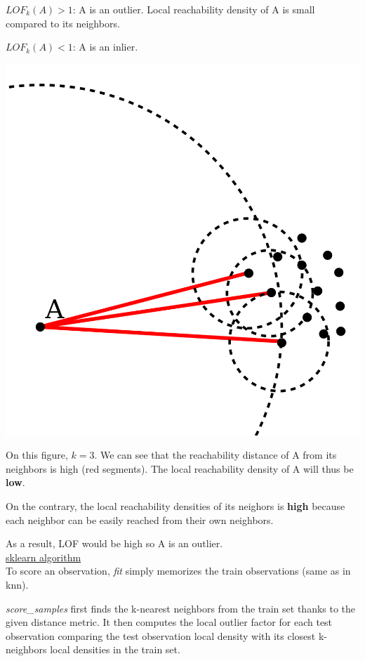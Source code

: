 $LOF_k(A) > 1$: A is an outlier. Local reachability density of A is small compared to its neighbors.

$LOF_k(A) < 1$: A is an inlier.

\begin{center}
\includegraphics[scale=0.10]{LOF.png}
\end{center}

On this figure, $k = 3$. We can see that the reachability distance of A from its neighbors is high (red segments). The local reachability density of A will thus be \textbf{low}.

On the contrary, the local reachability densities of its neighors is \textbf{high} because each neighbor can be easily reached from their own neighbors.

As a result, LOF would be high so A is an outlier. \\

\underline{sklearn algorithm} \\

To score an observation, \textit{fit} simply memorizes the train observations (same as in knn). 

\textit{score\_samples} first finds the k-nearest neighbors from the train set thanks to the given distance metric. It then computes the local outlier factor for each test observation comparing the test observation local density with its closest k-neighbors local densities in the train set.

\vspace{5mm}